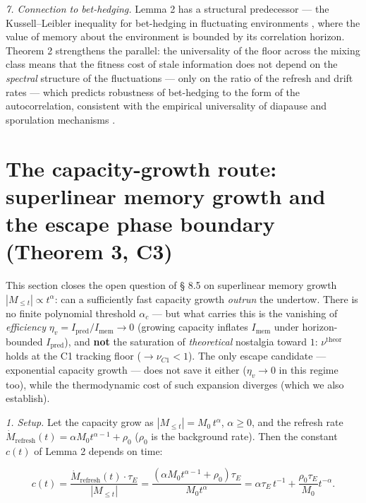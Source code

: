 \documentclass[12pt]{iopart}
\begin{document}
\emph{7. Connection to bet-hedging.} Lemma 2 has a structural predecessor --- the Kussell--Leibler inequality for bet-hedging in fluctuating environments \cite{KussellLeibler2005}, where the value of memory about the environment is bounded by its correlation horizon. Theorem 2 strengthens the parallel: the universality of the floor across the mixing class means that the fitness cost of stale information does not depend on the \emph{spectral} structure of the fluctuations --- only on the ratio of the refresh and drift rates --- which predicts robustness of bet-hedging to the form of the autocorrelation, consistent with the empirical universality of diapause and sporulation mechanisms \cite{DecaesteckerDaphnia2007,ErringtonSporulation2003}.



\section{The capacity-growth route: superlinear memory growth and the escape phase boundary (Theorem 3, C3)}\label{the-capacity-growth-route-superlinear-memory-growth-and-the-escape-phase-boundary-theorem-3-c3}



This section closes the open question of § 8.5 \cite{Andriishin2026b} on superlinear memory growth \(|M_{\le t}| \propto t^\alpha\): can a sufficiently fast capacity growth \emph{outrun} the undertow. There is no finite polynomial threshold \(\alpha_c\) --- but what carries this is the vanishing of \emph{efficiency} \(\eta_v = I_{\text{pred}}/I_{\text{mem}} \to 0\) (growing capacity inflates \(I_{\text{mem}}\) under horizon-bounded \(I_{\text{pred}}\)), and \textbf{not} the saturation of \emph{theoretical} nostalgia toward \(1\): \(\nu^{\text{theor}}\) holds at the C1 tracking floor (\(\to \nu_{C1} < 1\)). The only escape candidate --- exponential capacity growth --- does not save it either (\(\eta_v \to 0\) in this regime too), while the thermodynamic cost of such expansion diverges (which we also establish).



\emph{1. Setup.} Let the capacity grow as \(|M_{\le t}| = M_0\,t^\alpha\), \(\alpha \ge 0\), and the refresh rate \(\dot M_{\text{refresh}}(t) = \alpha M_0 t^{\alpha-1} + \rho_0\) (\(\rho_0\) is the background rate). Then the constant \(c(t)\) of Lemma 2 depends on time:



\begin{equation}c(t) = \frac{\dot M_{\text{refresh}}(t)\cdot\tau_E}{|M_{\le t}|} = \frac{(\alpha M_0 t^{\alpha-1} + \rho_0)\tau_E}{M_0 t^\alpha} = \alpha\tau_E\,t^{-1} + \frac{\rho_0\tau_E}{M_0}t^{-\alpha}. \tag{5.1}\end{equation}
\end{document}
